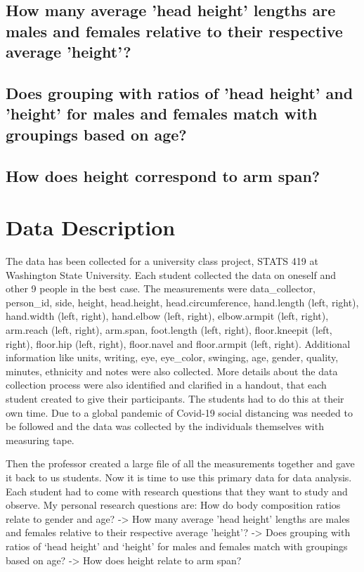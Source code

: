 \documentclass[]{article}
\begin{document}
\subsection{How many average ’head height’ lengths are males and females relative to their respective average ’height’?}
\label{sec:rq2}

\subsection{Does grouping with ratios of 'head height' and 'height' for males and females match with groupings based on age?}
\label{sec:rq3}

\subsection{How does height correspond to arm span?}
\label{sec:rq4}

\section{Data Description}
\label{sec:data}

The data has been collected for a university class project, STATS 419 at
Washington State University. Each student collected the data on oneself
and other 9 people in the best case. The measurements were
data\_collector, person\_id, side, height, head.height,
head.circumference, hand.length (left, right), hand.width (left, right),
hand.elbow (left, right), elbow.armpit (left, right), arm.reach (left,
right), arm.span, foot.length (left, right), floor.kneepit (left,
right), floor.hip (left, right), floor.navel and floor.armpit (left,
right). Additional information like units, writing, eye, eye\_color,
swinging, age, gender, quality, minutes, ethnicity and notes were also
collected. More details about the data collection process were also
identified and clarified in a handout, that each student created to give
their participants. The students had to do this at their own time. Due
to a global pandemic of Covid-19 social distancing was needed to be
followed and the data was collected by the individuals themselves with
measuring tape.

Then the professor created a large file of all the measurements together
and gave it back to us students. Now it is time to use this primary data
for data analysis. Each student had to come with research questions that
they want to study and observe. My personal research questions are: How
do body composition ratios relate to gender and age? -\textgreater{} How
many average 'head height' lengths are males and females relative to
their respective average 'height'? -\textgreater{} Does grouping with
ratios of `head height' and `height' for males and females match with
groupings based on age? -\textgreater{} How does height relate to arm
span?
\end{document}
